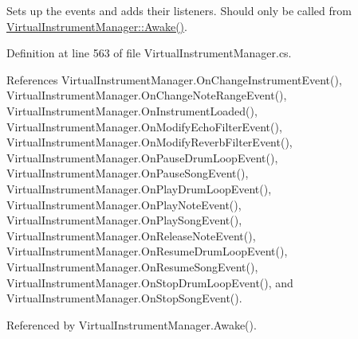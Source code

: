 Sets up the events and adds their listeners. Should only be called from \hyperlink{group___v_i_m_unity_gab92bac4e22476ffe39fc40f49fbd6ae5}{Virtual\+Instrument\+Manager\+::\+Awake()}. 



Definition at line 563 of file Virtual\+Instrument\+Manager.\+cs.



References Virtual\+Instrument\+Manager.\+On\+Change\+Instrument\+Event(), Virtual\+Instrument\+Manager.\+On\+Change\+Note\+Range\+Event(), Virtual\+Instrument\+Manager.\+On\+Instrument\+Loaded(), Virtual\+Instrument\+Manager.\+On\+Modify\+Echo\+Filter\+Event(), Virtual\+Instrument\+Manager.\+On\+Modify\+Reverb\+Filter\+Event(), Virtual\+Instrument\+Manager.\+On\+Pause\+Drum\+Loop\+Event(), Virtual\+Instrument\+Manager.\+On\+Pause\+Song\+Event(), Virtual\+Instrument\+Manager.\+On\+Play\+Drum\+Loop\+Event(), Virtual\+Instrument\+Manager.\+On\+Play\+Note\+Event(), Virtual\+Instrument\+Manager.\+On\+Play\+Song\+Event(), Virtual\+Instrument\+Manager.\+On\+Release\+Note\+Event(), Virtual\+Instrument\+Manager.\+On\+Resume\+Drum\+Loop\+Event(), Virtual\+Instrument\+Manager.\+On\+Resume\+Song\+Event(), Virtual\+Instrument\+Manager.\+On\+Stop\+Drum\+Loop\+Event(), and Virtual\+Instrument\+Manager.\+On\+Stop\+Song\+Event().



Referenced by Virtual\+Instrument\+Manager.\+Awake().


